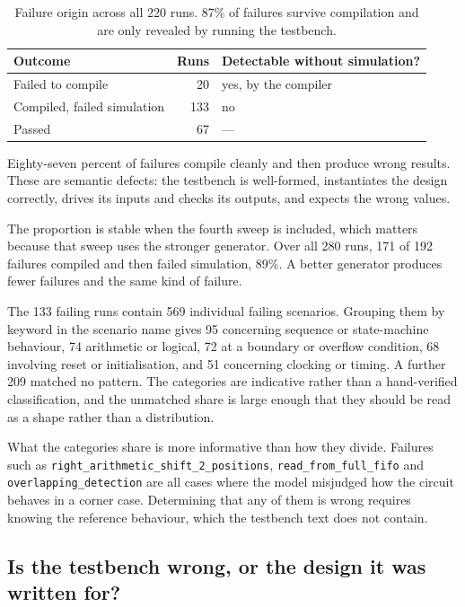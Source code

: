 \documentclass[11pt,a4paper,titlepage=false]{scrreprt}
\begin{document}
\begin{table}[H]
\centering
\small
\begin{tabular}{@{}l r p{5.6cm}@{}}
\toprule
\textbf{Outcome} & \textbf{Runs} & \textbf{Detectable without simulation?} \\
\midrule
Failed to compile               & 20  & yes, by the compiler \\
Compiled, failed simulation     & 133 & no \\
Passed                          & 67  & --- \\
\bottomrule
\end{tabular}
\caption{Failure origin across all 220 runs. 87\% of failures survive compilation and are
only revealed by running the testbench.}
\label{tab:failure-origin}
\end{table}

Eighty-seven percent of failures compile cleanly and then produce wrong results. These are
semantic defects: the testbench is well-formed, instantiates the design correctly, drives
its inputs and checks its outputs, and expects the wrong values.

The proportion is stable when the fourth sweep is included, which matters because that sweep
uses the stronger generator. Over all 280 runs, 171 of 192 failures compiled and then failed
simulation, 89\%. A better generator produces fewer failures and the same kind of failure.

The 133 failing runs contain 569 individual failing scenarios. Grouping them by keyword in
the scenario name gives 95 concerning sequence or state-machine behaviour, 74 arithmetic or
logical, 72 at a boundary or overflow condition, 68 involving reset or initialisation, and
51 concerning clocking or timing. A further 209 matched no pattern. The categories are
indicative rather than a hand-verified classification, and the unmatched share is large
enough that they should be read as a shape rather than a distribution.

What the categories share is more informative than how they divide. Failures such as
\texttt{right\_arithmetic\_shift\_2\_positions}, \texttt{read\_from\_full\_fifo} and
\texttt{overlapping\_detection} are all cases where the model misjudged how the circuit
behaves in a corner case. Determining that any of them is wrong requires knowing the
reference behaviour, which the testbench text does not contain.

\subsection*{Is the testbench wrong, or the design it was written for?}
\end{document}

